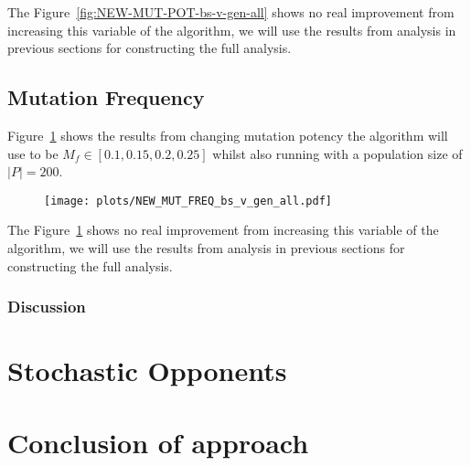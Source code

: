 The Figure~\ref{fig:NEW-MUT-POT-bs-v-gen-all} shows no real improvement from increasing this variable of the algorithm, we will use the results from analysis in previous sections for constructing the full analysis.

\subsection{Mutation Frequency}\label{subsec:mutationFrequency}
Figure~\ref{fig:NEW-MUT-FREQ-bs-gen-all} shows the results from changing mutation potency the algorithm will use to be \(M_f \in [0.1,0.15,0.2,0.25] \) whilst also running with a population size of \(|P|=200\).

\begin{figure}[h]
    \texttt{[image: plots/NEW\_MUT\_FREQ\_bs\_v\_gen\_all.pdf]}
    \caption{}\label{fig:NEW-MUT-FREQ-bs-gen-all}
\end{figure}

The Figure~\ref{fig:NEW-MUT-FREQ-bs-gen-all} shows no real improvement from increasing this variable of the algorithm, we will use the results from analysis in previous sections for constructing the full analysis.

\subsubsection{Discussion}\label{subsubsec:discussion}

\section{Stochastic Opponents}\label{sec:stochasticOpponents}

\section{Conclusion of approach}\label{sec:conclusionOfApproach}